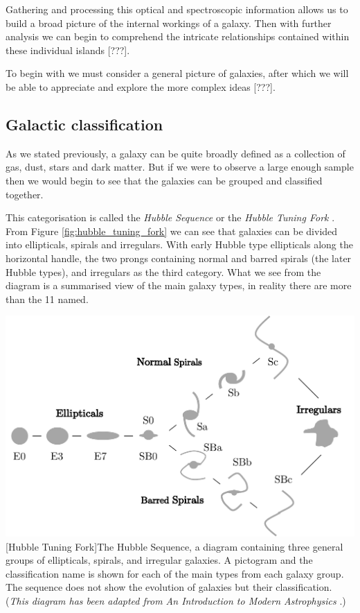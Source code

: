 \documentclass[12pt, twocolumn]{revtex4}    %
\begin{document}
Gathering and processing this optical and spectroscopic information allows us to build a broad picture of the internal workings of a galaxy. Then with further analysis we can begin to comprehend the intricate relationships contained within these individual islands [???]. 

To begin with we must consider a general picture of galaxies, after which we will be able to appreciate and explore the more complex ideas [???].

\subsection{Galactic classification}

As we stated previously, a galaxy can be quite broadly defined as a collection of gas, dust, stars and dark matter. But if we were to observe a large enough sample then we would begin to see that the galaxies can be grouped and classified together.

This categorisation is called the \textit{Hubble Sequence} or the \textit{Hubble Tuning Fork} \cite{carroll_astro}. From Figure \ref{fig:hubble_tuning_fork} we can see that galaxies can be divided into ellipticals, spirals and irregulars. With early Hubble type ellipticals along the horizontal handle, the two prongs containing normal and barred spirals (the later Hubble types), and irregulars as the third category. What we see from the diagram is a summarised view of the main galaxy types, in reality there are more than the 11 named. 

\begin{center}
\includegraphics[width=1.0\linewidth]{introduction/hubble_tuning_fork}
[Hubble Tuning Fork]{The Hubble Sequence, a diagram containing three general groups of ellipticals, spirals, and irregular galaxies. A pictogram and the classification name is shown for each of the main types from each galaxy group. The sequence does not show the evolution of galaxies but their classification. \\ (\textit{This diagram has been adapted from An Introduction to Modern Astrophysics} \cite{carroll_astro}.)}
\label{fig:hubble_tuning_fork}
\end{center}
\end{document}
